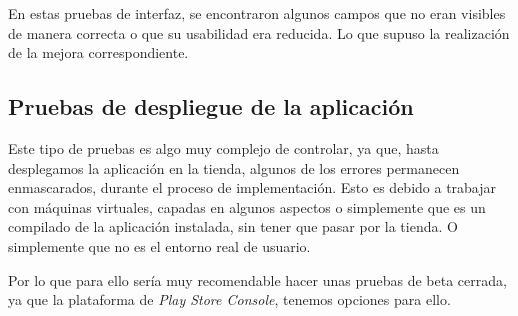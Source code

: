 En estas pruebas de interfaz, se encontraron algunos campos que no eran visibles de manera correcta o que su usabilidad era reducida. Lo que supuso la realización de la mejora correspondiente.

\subsection{Pruebas de despliegue de la aplicación}
Este tipo de pruebas es algo muy complejo de controlar, ya que, hasta desplegamos la aplicación en la tienda, algunos de los errores permanecen enmascarados, durante el proceso de implementación. Esto es debido a trabajar con máquinas virtuales, capadas en algunos aspectos o simplemente que es un compilado de la aplicación instalada, sin tener que pasar por la tienda. O simplemente que no es el entorno real de usuario.

Por lo que para ello sería muy recomendable hacer unas pruebas de beta cerrada, ya que la plataforma de \emph{Play Store Console}, tenemos opciones para ello.